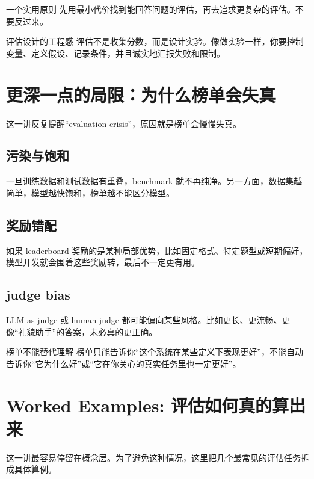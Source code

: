 \documentclass[a4paper]{article}
\begin{document}
\begin{importantbox}{一个实用原则}
先用最小代价找到能回答问题的评估，再去追求更复杂的评估。不要反过来。
\end{importantbox}

\begin{knowledgebox}{评估设计的工程感}
评估不是收集分数，而是设计实验。像做实验一样，你要控制变量、定义假设、记录条件，并且诚实地汇报失败和限制。
\end{knowledgebox}

\section{更深一点的局限：为什么榜单会失真}

这一讲反复提醒“evaluation crisis”，原因就是榜单会慢慢失真。

\subsection{污染与饱和}

一旦训练数据和测试数据有重叠，benchmark 就不再纯净。另一方面，数据集越简单，模型越快饱和，榜单越不能区分模型。

\subsection{奖励错配}

如果 leaderboard 奖励的是某种局部优势，比如固定格式、特定题型或短期偏好，模型开发就会围着这些奖励转，最后不一定更有用。

\subsection{judge bias}

LLM-as-judge 或 human judge 都可能偏向某些风格。比如更长、更流畅、更像“礼貌助手”的答案，未必真的更正确。

\begin{warningbox}{榜单不能替代理解}
榜单只能告诉你“这个系统在某些定义下表现更好”，不能自动告诉你“它为什么好”或“它在你关心的真实任务里也一定更好”。
\end{warningbox}

\section{Worked Examples: 评估如何真的算出来}

这一讲最容易停留在概念层。为了避免这种情况，这里把几个最常见的评估任务拆成具体算例。
\end{document}
